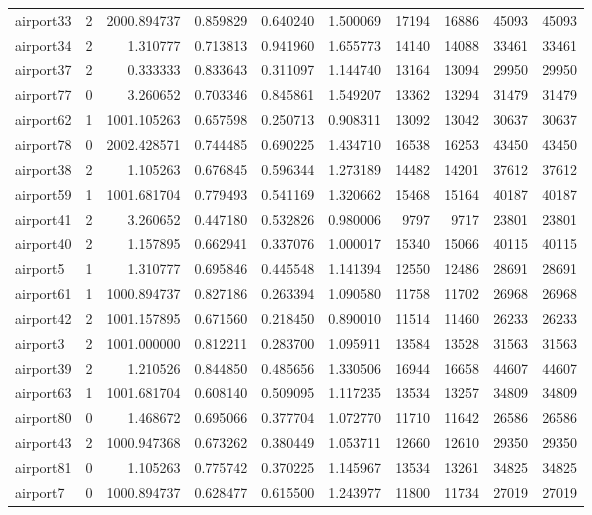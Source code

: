 \begin{longtable}{|l|r|r|r|r|r|r|r|r|r|}
airport33 & 2 & 2000.894737 & 0.859829 & 0.640240 & 1.500069 & 17194 & 16886 & 45093 & 45093 \\
airport34 & 2 & 1.310777 & 0.713813 & 0.941960 & 1.655773 & 14140 & 14088 & 33461 & 33461 \\
airport37 & 2 & 0.333333 & 0.833643 & 0.311097 & 1.144740 & 13164 & 13094 & 29950 & 29950 \\
airport77 & 0 & 3.260652 & 0.703346 & 0.845861 & 1.549207 & 13362 & 13294 & 31479 & 31479 \\
airport62 & 1 & 1001.105263 & 0.657598 & 0.250713 & 0.908311 & 13092 & 13042 & 30637 & 30637 \\
airport78 & 0 & 2002.428571 & 0.744485 & 0.690225 & 1.434710 & 16538 & 16253 & 43450 & 43450 \\
airport38 & 2 & 1.105263 & 0.676845 & 0.596344 & 1.273189 & 14482 & 14201 & 37612 & 37612 \\
airport59 & 1 & 1001.681704 & 0.779493 & 0.541169 & 1.320662 & 15468 & 15164 & 40187 & 40187 \\
airport41 & 2 & 3.260652 & 0.447180 & 0.532826 & 0.980006 & 9797 & 9717 & 23801 & 23801 \\
airport40 & 2 & 1.157895 & 0.662941 & 0.337076 & 1.000017 & 15340 & 15066 & 40115 & 40115 \\
airport5 & 1 & 1.310777 & 0.695846 & 0.445548 & 1.141394 & 12550 & 12486 & 28691 & 28691 \\
airport61 & 1 & 1000.894737 & 0.827186 & 0.263394 & 1.090580 & 11758 & 11702 & 26968 & 26968 \\
airport42 & 2 & 1001.157895 & 0.671560 & 0.218450 & 0.890010 & 11514 & 11460 & 26233 & 26233 \\
airport3 & 2 & 1001.000000 & 0.812211 & 0.283700 & 1.095911 & 13584 & 13528 & 31563 & 31563 \\
airport39 & 2 & 1.210526 & 0.844850 & 0.485656 & 1.330506 & 16944 & 16658 & 44607 & 44607 \\
airport63 & 1 & 1001.681704 & 0.608140 & 0.509095 & 1.117235 & 13534 & 13257 & 34809 & 34809 \\
airport80 & 0 & 1.468672 & 0.695066 & 0.377704 & 1.072770 & 11710 & 11642 & 26586 & 26586 \\
airport43 & 2 & 1000.947368 & 0.673262 & 0.380449 & 1.053711 & 12660 & 12610 & 29350 & 29350 \\
airport81 & 0 & 1.105263 & 0.775742 & 0.370225 & 1.145967 & 13534 & 13261 & 34825 & 34825 \\
airport7 & 0 & 1000.894737 & 0.628477 & 0.615500 & 1.243977 & 11800 & 11734 & 27019 & 27019 \\

\end{longtable}
